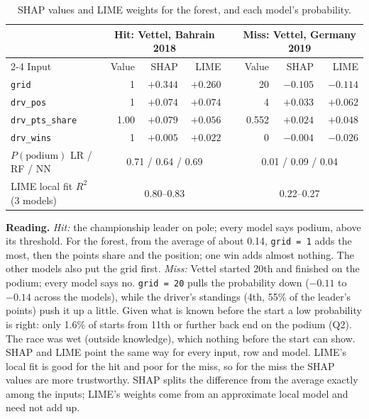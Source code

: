 \documentclass[11pt,a4paper]{article}
\newcommand{\code}[1]{\texttt{#1}}
\begin{document}
\begin{table}[H]
\centering\small
\caption{SHAP values and LIME weights for the forest, and each model's probability.}
\label{tab:local}
\begin{tabular}{lrrrcrrr}
\toprule
 & \multicolumn{3}{c}{Hit: Vettel, Bahrain 2018} && \multicolumn{3}{c}{Miss: Vettel, Germany 2019} \\
\cmidrule{2-4}\cmidrule{6-8}
Input & Value & SHAP & LIME && Value & SHAP & LIME \\
\midrule
\code{grid} & 1 & $+0.344$ & $+0.260$ && 20 & $-0.105$ & $-0.114$ \\
\code{drv\_pos} & 1 & $+0.074$ & $+0.074$ && 4 & $+0.033$ & $+0.062$ \\
\code{drv\_pts\_share} & 1.00 & $+0.079$ & $+0.056$ && 0.552 & $+0.024$ & $+0.048$ \\
\code{drv\_wins} & 1 & $+0.005$ & $+0.022$ && 0 & $-0.004$ & $-0.026$ \\
\midrule
$P(\text{podium})$ LR / RF / NN & \multicolumn{3}{c}{0.71 / 0.64 / 0.69} && \multicolumn{3}{c}{0.01 / 0.09 / 0.04} \\
LIME local fit $R^2$ (3 models) & \multicolumn{3}{c}{0.80--0.83} && \multicolumn{3}{c}{0.22--0.27} \\
\bottomrule
\end{tabular}
\end{table}

\textbf{Reading.} \emph{Hit:} the championship leader on pole; every model says podium, above its threshold. For the forest, from the average of about 0.14, \code{grid = 1} adds the most, then the points share and the position; one win adds almost nothing. The other models also put the grid first.
\emph{Miss:} Vettel started 20th and finished on the podium; every model says no. \code{grid = 20} pulls the probability down ($-0.11$ to $-0.14$ across the models), while the driver's standings (4th, 55\% of the leader's points) push it up a little. Given what is known before the start a low probability is right: only 1.6\% of starts from 11th or further back end on the podium (Q2). The race was wet (outside knowledge), which nothing before the start can show.
SHAP and LIME point the same way for every input, row and model. LIME's local fit is good for the hit and poor for the miss, so for the miss the SHAP values are more trustworthy. SHAP splits the difference from the average exactly among the inputs; LIME's weights come from an approximate local model and need not add up.

\end{document}
